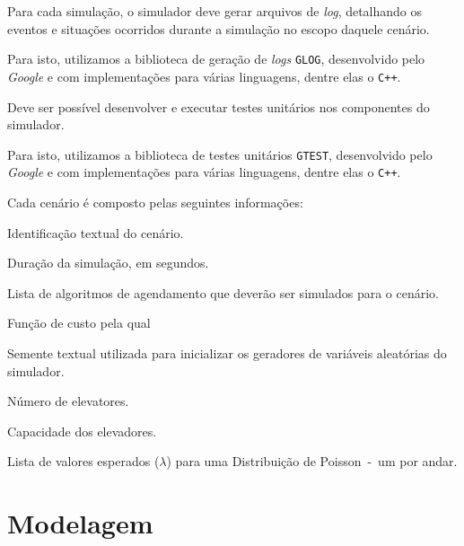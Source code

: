 \begin{description}[leftmargin=!,labelwidth=\widthof{\bfseries Determinístico}]
  \item[Rastreável]

  Para cada simulação, o simulador deve gerar arquivos de \textit{log},
  detalhando os eventos e situações ocorridos durante a simulação no escopo
  daquele cenário.

  Para isto, utilizamos a biblioteca de geração de \textit{logs} \texttt{GLOG},
  desenvolvido pelo \textit{Google} e com implementações para várias linguagens,
  dentre elas o \texttt{C++}.

  \item[Testável]

  Deve ser possível desenvolver e executar testes unitários nos componentes do
  simulador.

  Para isto, utilizamos a biblioteca de testes unitários \texttt{GTEST},
  desenvolvido pelo \textit{Google} e com implementações para várias linguagens,
  dentre elas o \texttt{C++}.

\end{description}

Cada cenário é composto pelas seguintes informações:

\begin{description}[leftmargin=!,labelwidth=\widthof{\bfseries Função de Custo}]
  \item[Nome] Identificação textual do cenário.
  \item[Duração] Duração da simulação, em segundos.
  \item[Agendador] Lista de algoritmos de agendamento que deverão ser simulados para o cenário.
  \item[Horizonte]
  \item[Função de Custo] Função de custo pela qual
  \item[Semente] Semente textual utilizada para inicializar os geradores de variáveis aleatórias do simulador.
  \item[Elevadores] Número de elevatores.
  \item[Capacidade] Capacidade dos elevadores.
  \item[Andares] Lista de valores esperados ($\lambda$) para uma Distribuição de Poisson~-~um por andar.
\end{description}

\section{\label{subsec:simulator:modeling}Modelagem}


